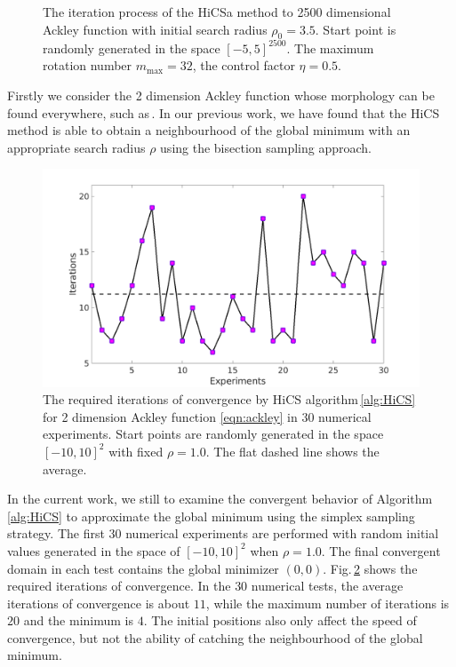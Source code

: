 \documentclass[final,1p,times]{elsarticle}
\begin{document}
\begin{figure}[!htbp]
	  \caption{The iteration process of the HiCSa method to 2500
	  dimensional Ackley function with initial search
	  radius $\rho_0=3.5$. Start point is randomly generated in the
	  space $[-5, 5]^{2500}$. The maximum rotation number
	  $m_{\max}=32$, the control factor $\eta=0.5$.  } 
	\label{fig:ackley2500D:HiCSa}
\end{figure}

\newpage

Firstly we consider the 2 dimension Ackley function whose   
morphology can be found everywhere, such
as\,\cite{huang2017hill}.
In our previous work, we have found that the 
HiCS method is able to obtain a neighbourhood of the
global minimum with an appropriate search radius $\rho$ using the
bisection sampling approach. 
\begin{figure}[!htbp]
	\centering
	  \includegraphics[scale=0.3]{../figures/ackley2Drand.png}
	  \caption{The required iterations of convergence by HiCS
	  algorithm\,\ref{alg:HiCS} for 2 dimension Ackley function
	  \eqref{eqn:ackley} in $30$ numerical experiments. 
	  Start points are randomly generated in the space
	  $[-10, 10]^2$ with fixed $\rho=1.0$.
	  The flat dashed line shows the average.} 
	  \label{fig:ackley:randInit}
\end{figure}
In the current work, we still to examine the convergent behavior of
Algorithm\,\ref{alg:HiCS} to approximate the global minimum using
the simplex sampling strategy. The first $30$ numerical
experiments are performed with random initial values generated in
the space of $[-10, 10]^2$ when $\rho=1.0$.
The final convergent domain in each test contains the global minimizer $(0,0)$.
Fig.\,\ref{fig:ackley:randInit} shows the required iterations
of convergence. In the $30$ numerical tests, the average iterations of
convergence is about $11$, while the maximum number of
iterations is $20$ and the minimum is $4$. 
The initial positions also only affect the
speed of convergence, but not the ability of catching the
neighbourhood of the global minimum. 
\end{document}
